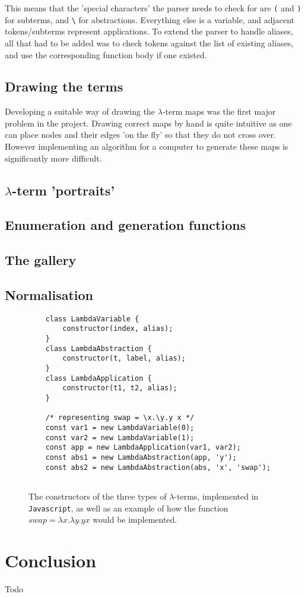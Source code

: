 \documentclass[12pt]{article}
\begin{document}
This means that the 'special characters' the parser needs to check for are \texttt{(} and \texttt{)} for subterms, and \texttt{\textbackslash} for abstractions. Everything else is a variable, and adjacent tokens/subterms represent applications. To extend the parser to handle aliases, all that had to be added was to check tokens against the list of existing aliases, and use the corresponding function body if one existed.

\subsection{Drawing the terms}
Developing a suitable way of drawing the $\lambda$-term maps was the first major problem in the project. Drawing correct maps by hand is quite intuitive as one can place nodes and their edges 'on the fly' so that they do not cross over. However implementing an algorithm for a computer to generate these maps is significantly more difficult.

\subsection{\texorpdfstring{$\lambda$}{Lambda}-term 'portraits'}

\subsection{Enumeration and generation functions}

\subsection{The gallery}

\subsection{Normalisation}

\begin{figure}
    \begin{verbatim}
    class LambdaVariable { 
        constructor(index, alias); 
    }
    class LambdaAbstraction { 
        constructor(t, label, alias); 
    }
    class LambdaApplication { 
        constructor(t1, t2, alias); 
    }
    
    /* representing swap = \x.\y.y x */
    const var1 = new LambdaVariable(0);     
    const var2 = new LambdaVariable(1);      
    const app = new LambdaApplication(var1, var2);  
    const abs1 = new LambdaAbstraction(app, 'y');    
    const abs2 = new LambdaAbstraction(abs, 'x', 'swap');   
    
    \end{verbatim}
    \caption{The constructors of the three types of $\lambda$-terms, implemented in \texttt{Javascript}, as well as an example of how the function $swap = \lambda x. \lambda y. y x$ would be implemented.}
    \label{fig:implementation}
\end{figure}
\newpage

\section{Conclusion}
\label{sec:conclusion}
Todo

\newpage


\end{document}
